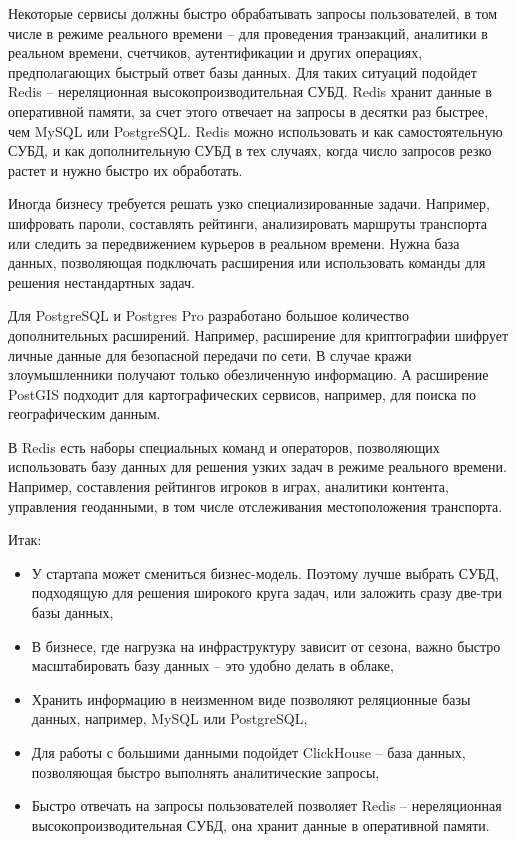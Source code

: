 \documentclass[%
	11pt,
	a4paper,
	utf8,
		]{article}
\begin{document}
Некоторые сервисы должны быстро обрабатывать запросы пользователей, в том числе в режиме реального времени -- для проведения транзакций, аналитики в реальном времени, счетчиков, аутентификации и других операциях, предполагающих быстрый ответ базы данных. Для таких ситуаций подойдет Redis -- нереляционная высокопроизводительная СУБД. Redis хранит данные в оперативной памяти, за счет этого отвечает на запросы в десятки раз быстрее, чем MySQL или PostgreSQL. Redis можно использовать и как самостоятельную СУБД, и как дополнительную СУБД в тех случаях, когда число запросов резко растет и нужно быстро их обработать.

Иногда бизнесу требуется решать узко специализированные задачи. Например, шифровать пароли, составлять рейтинги, анализировать маршруты транспорта или следить за передвижением курьеров в реальном времени. Нужна база данных, позволяющая подключать расширения или использовать команды для решения нестандартных задач. 

Для PostgreSQL и Postgres Pro разработано большое количество дополнительных расширений. Например, расширение для криптографии шифрует личные данные для безопасной передачи по сети. В случае кражи злоумышленники получают только обезличенную информацию. А расширение PostGIS подходит для картографических сервисов, например, для поиска по географическим данным.

В Redis есть наборы специальных команд и операторов, позволяющих использовать базу данных для решения узких задач в режиме реального времени. Например, составления рейтингов игроков в играх, аналитики контента, управления геоданными, в том числе отслеживания местоположения транспорта.

Итак:
\begin{itemize}
	\item У стартапа может смениться бизнес-модель. Поэтому лучше выбрать СУБД, подходящую для решения широкого круга задач, или заложить сразу две-три базы данных,
	
	\item В бизнесе, где нагрузка на инфраструктуру зависит от сезона, важно быстро масштабировать базу данных -- это удобно делать в облаке,
	
	\item Хранить информацию в неизменном виде позволяют реляционные базы данных, например, MySQL или PostgreSQL,
	
	\item Для работы с большими данными подойдет ClickHouse -- база данных, позволяющая быстро выполнять аналитические запросы,
	
	\item Быстро отвечать на запросы пользователей позволяет Redis -- нереляционная высокопроизводительная СУБД, она хранит данные в оперативной памяти.
\end{itemize}
\end{document}
